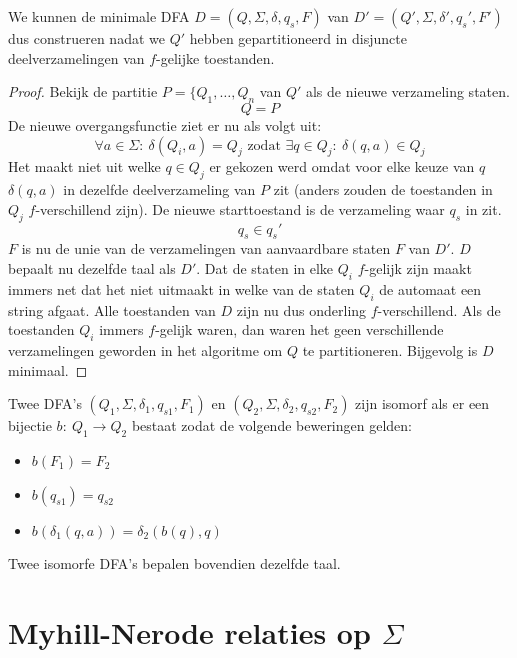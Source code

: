 \documentclass[main.tex]{subfiles}
\begin{document}
\begin{gev}
  We kunnen de minimale DFA $D = (Q,\Sigma,\delta,q_{s},F)$ van $D' = (Q',\Sigma,\delta',q_{s}',F')$ dus construeren nadat we $Q'$ hebben gepartitioneerd in disjuncte deelverzamelingen van $f$-gelijke toestanden.

  \begin{proof}
    Bekijk de partitie $P = \{Q_{1},\dotsc,Q_{n}$ van $Q'$ als de nieuwe verzameling staten.
    \[ Q = P \]
    De nieuwe overgangsfunctie ziet er nu als volgt uit:
    \[ \forall a \in \Sigma:\ \delta(Q_{i},a) = Q_{j} \text{ zodat } \exists q \in Q_{j}:\ \delta(q,a) \in Q_{j} \]
    Het maakt niet uit welke $q\in Q_{j}$ er gekozen werd omdat voor elke keuze van $q$ $\delta(q,a)$ in dezelfde deelverzameling van $P$ zit (anders zouden de toestanden in $Q_{j}$ $f$-verschillend zijn).
    De nieuwe starttoestand is de verzameling waar $q_{s}$ in zit.
    \[ q_{s} \in q_{s}'\]
    $F$ is nu de unie van de verzamelingen van aanvaardbare staten $F$ van $D'$.
    $D$ bepaalt nu dezelfde taal als $D'$.
    Dat de staten in elke $Q_{i}$ $f$-gelijk zijn maakt immers net dat het niet uitmaakt in welke van de staten $Q_{i}$ de automaat een string afgaat.
    Alle toestanden van $D$ zijn nu dus onderling $f$-verschillend.
    Als de toestanden $Q_{i}$ immers $f$-gelijk waren, dan waren het geen verschillende verzamelingen geworden in het algoritme om $Q$ te partitioneren.
    Bijgevolg is $D$ minimaal.
  \end{proof}
\end{gev}

\begin{de}
  Twee DFA's $(Q_{1},\Sigma,\delta_{1},q_{s1},F_{1})$ en $(Q_{2},\Sigma,\delta_{2},q_{s2},F_{2})$ zijn isomorf als er een bijectie $b:\ Q_{1} \rightarrow Q_{2}$ bestaat zodat de volgende beweringen gelden:
  \begin{itemize}
  \item $b(F_{1}) = F_{2}$
  \item $b(q_{s1}) = q_{s2}$
  \item $b(\delta_{1}(q,a)) = \delta_{2}(b(q),q)$
  \end{itemize}
  Twee isomorfe DFA's bepalen bovendien dezelfde taal.
\end{de}


\section{Myhill-Nerode relaties op $\Sigma$}
\label{sec:myhill-nerode-relaties}
\end{document}

